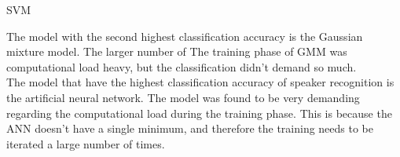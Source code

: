 SVM

The model with the second highest classification accuracy is the Gaussian mixture model.
The larger number of 
The training phase of GMM was computational load heavy, but the classification didn't demand so much.\\

The model that have the highest classification accuracy of speaker recognition is the artificial neural network.
The model was found to be very demanding regarding the computational load during the training phase. 
This is because the ANN doesn't have a single minimum, and therefore the training needs to be iterated a large number of times. 




